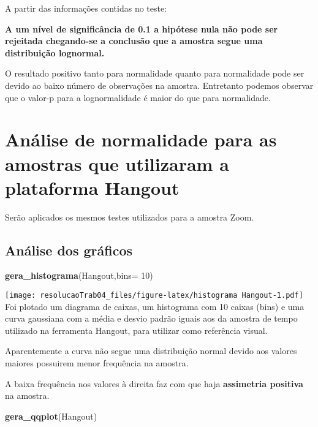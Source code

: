 \documentclass[
]{article}
\newenvironment{Shaded}{\begin{snugshade}}{\end{snugshade}}
\newcommand{\DataTypeTok}[1]{\textcolor[rgb]{0.13,0.29,0.53}{#1}}
\newcommand{\DecValTok}[1]{\textcolor[rgb]{0.00,0.00,0.81}{#1}}
\newcommand{\KeywordTok}[1]{\textcolor[rgb]{0.13,0.29,0.53}{\textbf{#1}}}
\newcommand{\NormalTok}[1]{#1}
\begin{document}
A partir das informações contidas no teste:

\textbf{A um nível de significância de 0.1 a hipótese nula não pode ser
rejeitada chegando-se a conclusão que a amostra segue uma distribuição
lognormal.}

O resultado positivo tanto para normalidade quanto para normalidade pode
ser devido ao baixo número de observações na amostra. Entretanto podemos
observar que o valor-p para a lognormalidade é maior do que para
normalidade.

\hypertarget{anuxe1lise-de-normalidade-para-as-amostras-que-utilizaram-a-plataforma-hangout}{%
\section{Análise de normalidade para as amostras que utilizaram a
plataforma
Hangout}\label{anuxe1lise-de-normalidade-para-as-amostras-que-utilizaram-a-plataforma-hangout}}

Serão aplicados os mesmos testes utilizados para a amostra Zoom.

\hypertarget{anuxe1lise-dos-gruxe1ficos-1}{%
\subsection{Análise dos gráficos}\label{anuxe1lise-dos-gruxe1ficos-1}}

\begin{Shaded}
\begin{Highlighting}[]
\KeywordTok{gera_histograma}\NormalTok{(Hangout,}\DataTypeTok{bins=} \DecValTok{10}\NormalTok{)}
\end{Highlighting}
\end{Shaded}

\texttt{[image: resolucaoTrab04\_files/figure-latex/histograma Hangout-1.pdf]}
Foi plotado um diagrama de caixas, um histograma com 10 caixas (bins) e
uma curva gaussiana com a média e desvio padrão iguais aos da amostra de
tempo utilizado na ferramenta Hangout, para utilizar como referência
visual.

Aparentemente a curva não segue uma distribuição normal devido aos
valores maiores possuirem menor frequência na amostra.

A baixa frequência nos valores à direita faz com que haja
\textbf{assimetria positiva} na amostra.

\begin{Shaded}
\begin{Highlighting}[]
\KeywordTok{gera_qqplot}\NormalTok{(Hangout)}
\end{Highlighting}
\end{Shaded}
\end{document}
